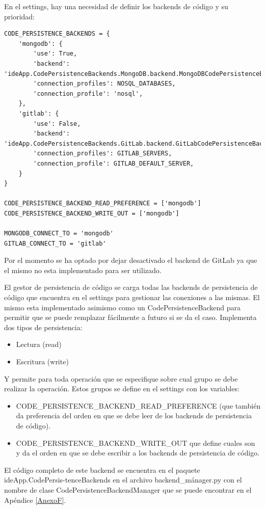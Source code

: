 En el settings, hay una necesidad de definir los backends de código y su prioridad:
\lstset{language=Python}
\begin{lstlisting}[breaklines]
CODE_PERSISTENCE_BACKENDS = {
    'mongodb': {
        'use': True,
        'backend': 'ideApp.CodePersistenceBackends.MongoDB.backend.MongoDBCodePersistenceBackend',
        'connection_profiles': NOSQL_DATABASES,
        'connection_profile': 'nosql',
    },
    'gitlab': {
        'use': False,
        'backend': 'ideApp.CodePersistenceBackends.GitLab.backend.GitLabCodePersistenceBackend',
        'connection_profiles': GITLAB_SERVERS,
        'connection_profile': GITLAB_DEFAULT_SERVER,
    }
}

CODE_PERSISTENCE_BACKEND_READ_PREFERENCE = ['mongodb']
CODE_PERSISTENCE_BACKEND_WRITE_OUT = ['mongodb']

MONGODB_CONNECT_TO = 'mongodb'
GITLAB_CONNECT_TO = 'gitlab'
\end{lstlisting}
\lstset{language=Bash}

Por el momento se ha optado por dejar desactivado el backend de GitLab ya que el mismo no esta implementado para ser utilizado.

El gestor de persistencia de código se carga todas las backends de persistencia de código que encuentra en el settings para gestionar las conexiones a las mismas. El mismo esta implementado asimismo como un CodePersistenceBackend para permitir que se puede remplazar fácilmente a futuro si se da el caso. Implementa dos tipos de persistencia:
\begin{itemize}
	\item Lectura (read)
	\item Escritura (write) 
\end{itemize}
Y permite para toda operación que se especifique sobre cual grupo se debe realizar la operación. Estos grupos se define en el settings con los variables:
\begin{itemize}
	\item CODE\_PERSISTENCE\_BACKEND\_READ\_PREFERENCE (que también da preferencia del orden en que se debe leer de los backends de persistencia de código).
	\item CODE\_PERSISTENCE\_BACKEND\_WRITE\_OUT que define cuales son y da el orden en que se debe escribir a los backends de persistencia de código.
\end{itemize}
El código completo de este backend se encuentra en el paquete ideApp.CodePersis-tenceBackends en el archivo backend\_mánager.py con el nombre de clase CodePersistenceBackendManager que se puede encontrar en el Apéndice \ref{AnexoF}.

